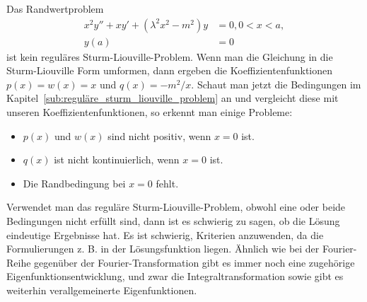\begin{beispiel}
	Das Randwertproblem
	\begin{equation}
		\begin{aligned}
		x^2y'' + xy' + (\lambda^2x^2 - m^2)y &= 0, 0<x<a,\\
		y(a) &= 0
		\end{aligned}
	\end{equation}
	ist kein reguläres Sturm-Liouville-Problem.
	Wenn man die Gleichung in die Sturm-Liouville Form umformen, dann ergeben
	die Koeffizientenfunktionen $p(x) = w(x) = x$ und $q(x) = -m^2/x$.
	Schaut man jetzt die Bedingungen im
	Kapitel~\ref{sub:reguläre_sturm_liouville_problem} an und vergleicht diese mit
	unseren Koeffizientenfunktionen, so erkennt man einige Probleme:
	\begin{itemize}
		\item $p(x)$ und $w(x)$ sind nicht positiv, wenn $x = 0$ ist.
		\item $q(x)$ ist nicht kontinuierlich, wenn $x = 0$ ist.
		\item Die Randbedingung bei $x = 0$ fehlt.
	\end{itemize}
\end{beispiel}

Verwendet man das reguläre Sturm-Liouville-Problem, obwohl eine oder beide
Bedingungen nicht erfüllt sind, dann ist es schwierig zu sagen, ob die Lösung
eindeutige Ergebnisse hat.
Es ist schwierig, Kriterien anzuwenden, da die Formulierungen z. B. in der
Lösungsfunktion liegen.
Ähnlich wie bei der Fourier-Reihe gegenüber der Fourier-Transformation gibt es
immer noch eine zugehörige Eigenfunktionsentwicklung, und zwar die
Integraltransformation sowie gibt es weiterhin verallgemeinerte Eigenfunktionen.
